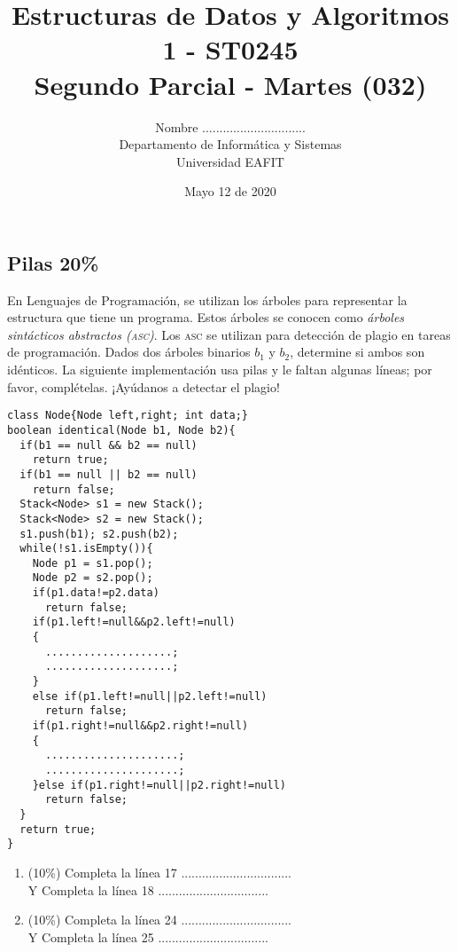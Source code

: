 \documentclass[10 pt]{article}
\title{\textbf {Estructuras de Datos y Algoritmos 1 - ST0245\\Segundo Parcial - Martes  (032) }}
\author{Nombre ..............................\\
		Departamento de Informática y Sistemas\\
		Universidad EAFIT\\}
\date{Mayo 12 de 2020}
\begin{document}
\lstset{escapechar=@,style=customc, numbers=left, stepnumber = 1} 
\maketitle
\begin{multicols}{2}
\section{Pilas 20\%}
En Lenguajes de Programación, se utilizan los árboles para representar la estructura que tiene un programa. Estos árboles se conocen como
\textit{árboles sintácticos abstractos (\textsc{asc})}. Los \textsc{asc} se utilizan para detección de plagio en tareas de programación. 
Dados dos árboles binarios $b_1$ y $b_2$, determine si ambos son idénticos. La siguiente implementación usa pilas y le faltan algunas líneas; por favor,  complételas. ¡Ayúdanos a detectar el plagio!

{\small
\begin{lstlisting}
class Node{Node left,right; int data;}
boolean identical(Node b1, Node b2){
  if(b1 == null && b2 == null)
    return true;
  if(b1 == null || b2 == null)
    return false;
  Stack<Node> s1 = new Stack();
  Stack<Node> s2 = new Stack();
  s1.push(b1); s2.push(b2);
  while(!s1.isEmpty()){
    Node p1 = s1.pop();
    Node p2 = s2.pop();
    if(p1.data!=p2.data)
      return false;
    if(p1.left!=null&&p2.left!=null)
    {
      ....................;
      ....................;
    }
    else if(p1.left!=null||p2.left!=null)
      return false;
    if(p1.right!=null&&p2.right!=null)
    {
      .....................;
      .....................;
    }else if(p1.right!=null||p2.right!=null)
      return false;
  }
  return true;
}
\end{lstlisting}
}
\begin{enumerate}[label=\Alph*]
	\item (10\%) Completa la línea 17
	................................\\
	Y Completa la línea 18
	................................
	\item (10\%) Completa la línea 24 ................................\\
	Y Completa la línea 25 ................................
\end{enumerate}

\end{multicols}
\end{document}
